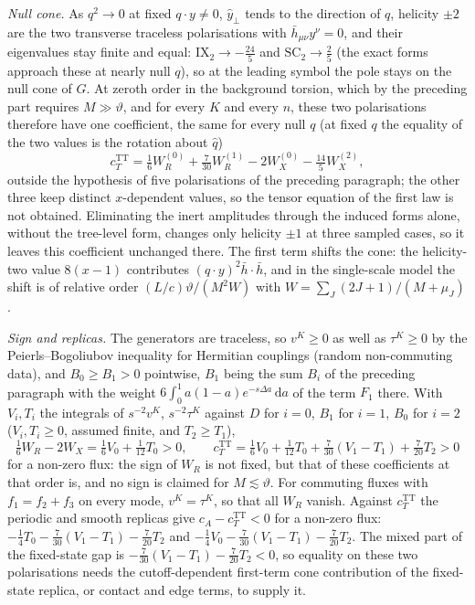 \emph{Null cone.} As \(q^2\to0\) at fixed \(q\cdot y\neq0\), \(\hat y_\perp\) tends to the direction of \(q\), helicity \(\pm2\) are the two transverse traceless polarisations with \(\bar h_{\mu\nu}y^\nu=0\), and their eigenvalues stay finite and equal: \(\mathrm{IX}_2\to-\tfrac{24}5\) and \(\mathrm{SC}_2\to\tfrac25\) (the exact forms approach these at nearly null \(q\)), so at the leading symbol the pole stays on the null cone of \(G\). At zeroth order in the background torsion, which by the preceding part requires \(M\gg\vartheta\), and for every \(K\) and every \(n\), these two polarisations therefore have one coefficient, the same for every null \(q\) (at fixed \(q\) the equality of the two values is the rotation about \(\hat q\))
\[
c_T^{\mathrm{TT}}=\tfrac16W_R^{(0)}+\tfrac7{30}W_R^{(1)}-2W_X^{(0)}-\tfrac{14}5W_X^{(2)},
\]
outside the hypothesis of five polarisations of the preceding paragraph; the other three keep distinct \(x\)-dependent values, so the tensor equation of the first law is not obtained. Eliminating the inert amplitudes through the induced forms alone, without the tree-level form, changes only helicity \(\pm1\) at three sampled cases, so it leaves this coefficient unchanged there. The first term shifts the cone: the helicity-two value \(8(x-1)\) contributes \((q\cdot y)^2\bar h\cdot\bar h\), and in the single-scale model the shift is of relative order \((L/c)\vartheta/(M^2W)\) with \(W=\sum_J(2J+1)/(M+\mu_J)\).

\emph{Sign and replicas.} The generators are traceless, so \(v^K\ge0\) as well as \(\tau^K\ge0\) by the Peierls--Bogoliubov inequality for Hermitian couplings (random non-commuting data), and \(B_0\ge B_1>0\) pointwise, \(B_1\) being the sum \(B_i\) of the preceding paragraph with the weight \(6\int_0^1a(1-a)e^{-s\Delta a}\,\mathrm da\) of the term \(F_1\) there. With \(V_i,T_i\) the integrals of \(s^{-2}v^K\), \(s^{-2}\tau^K\) against \(D\) for \(i=0\), \(B_1\) for \(i=1\), \(B_0\) for \(i=2\) (\(V_i,T_i\ge0\), assumed finite, and \(T_2\ge T_1\)),
\[
\tfrac16W_R-2W_X=\tfrac16V_0+\tfrac1{12}T_0>0,\qquad
c_T^{\mathrm{TT}}=\tfrac16V_0+\tfrac1{12}T_0+\tfrac7{30}(V_1-T_1)+\tfrac7{20}T_2>0
\]
for a non-zero flux: the sign of \(W_R\) is not fixed, but that of these coefficients at that order is, and no sign is claimed for \(M\lesssim\vartheta\). For commuting fluxes with \(f_1=f_2+f_3\) on every mode, \(v^K=\tau^K\), so that all \(W_R\) vanish. Against \(c_T^{\mathrm{TT}}\) the periodic and smooth replicas give \(c_A-c_T^{\mathrm{TT}}<0\) for a non-zero flux: \(-\tfrac14T_0-\tfrac7{30}(V_1-T_1)-\tfrac7{20}T_2\) and \(-\tfrac14V_0-\tfrac7{30}(V_1-T_1)-\tfrac7{20}T_2\). The mixed part of the fixed-state gap is \(-\tfrac7{30}(V_1-T_1)-\tfrac7{20}T_2<0\), so equality on these two polarisations needs the cutoff-dependent first-term cone contribution of the fixed-state replica, or contact and edge terms, to supply it.

